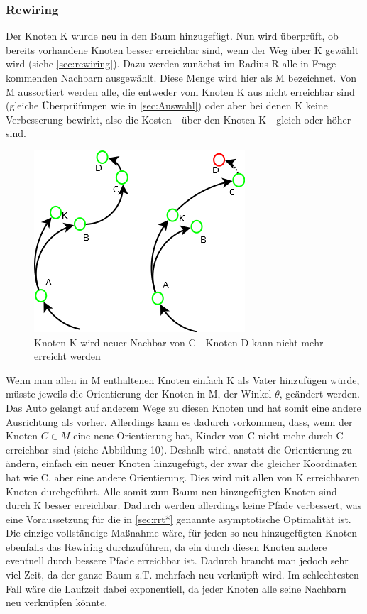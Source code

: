 \subsubsection{Rewiring}
Der Knoten K wurde neu in den Baum hinzugefügt. Nun wird überprüft, ob bereits vorhandene Knoten besser erreichbar sind, wenn der Weg über K gewählt wird (siehe \ref{sec:rewiring}).
Dazu werden zunächst im Radius R alle in Frage kommenden Nachbarn ausgewählt. Diese Menge wird hier als M bezeichnet. Von M aussortiert werden alle, die entweder vom Knoten K aus nicht erreichbar sind (gleiche Überprüfungen wie in \ref{sec:Auswahl}) oder aber bei denen K keine Verbesserung bewirkt, also die Kosten - über den Knoten K - gleich oder höher sind.
\begin{figure}
\centering
\label{fig:rewiringNodeInvalid}
\includegraphics[scale=0.7]{Bilder/Rewiring_ungueltige_knoten.png} 
\caption{Knoten K wird neuer Nachbar von C - Knoten D kann nicht mehr erreicht werden}
\end{figure}

Wenn man allen in M enthaltenen Knoten einfach K als Vater hinzufügen würde, müsste jeweils die Orientierung der Knoten in M, der Winkel $\theta$, geändert werden. Das Auto gelangt auf anderem Wege zu diesen Knoten und hat somit eine andere Ausrichtung als vorher. Allerdings kann es dadurch vorkommen, dass, wenn der Knoten $C \in M$ eine neue Orientierung hat, Kinder von C nicht mehr durch C erreichbar sind (siehe Abbildung 10). Deshalb wird, anstatt die Orientierung zu ändern, einfach ein neuer Knoten hinzugefügt, der zwar die gleicher Koordinaten hat wie C, aber eine andere Orientierung. Dies wird mit allen von K erreichbaren Knoten durchgeführt. Alle somit zum Baum neu hinzugefügten Knoten sind durch K besser erreichbar. Dadurch werden allerdings keine Pfade verbessert, was eine Voraussetzung für die in \ref{sec:rrt*} genannte asymptotische Optimalität ist.\\
Die einzige vollständige Maßnahme wäre, für jeden so neu hinzugefügten Knoten ebenfalls das Rewiring durchzuführen, da ein durch diesen Knoten andere eventuell durch bessere Pfade erreichbar ist. Dadurch braucht man jedoch sehr viel Zeit, da der ganze Baum z.T. mehrfach neu verknüpft wird. Im schlechtesten Fall wäre die Laufzeit dabei exponentiell, da jeder Knoten alle seine Nachbarn neu verknüpfen könnte.
